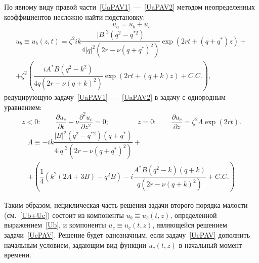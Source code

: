 По явному виду правой части~\eqref{UaPAV1}~---~\eqref{UaPAV2} методом неопределенных коэффициентов несложно найти подстановку:
\begin{equation}
u_{a}=u_{b}+u_{c}
\label{Ub+Uc}
\end{equation}
\begin{multline}
u_{b} \equiv u_{b} \left( z, t \right) = \zeta^{2}  i k \dfrac{\vert B \vert^{2} \left( q^{2}-q^{*2}\right)}{4 \vert q \vert^{2} \left( 2 r-\nu \left( q + q^{*} \right)^{2}\right)} \exp \left( 2 r t+ \left( q+q^{*}\right) z \right)+ \\
+\zeta^{2} \left( \dfrac{i A^{*} B \left( q^{2} - k^{2} \right)}{4 q \left( 2 r - \nu \left( q+k \right)^{2} \right)} \exp \left( 2 r t +\left( q+k\right) z \right) +C.C. \right),
\label{Ub}
\end{multline}
редуцирующую задачу~\eqref{UaPAV1}~---~\eqref{UaPAV2} в задачу с однородным уравнением:
\begin{equation}
z<0: \qquad  \dfrac{\partial u_{c}}{\partial t}- \nu \dfrac{\partial^{2} u_{c}}{\partial z^{2}}=0; \qquad \qquad z=0:\qquad  \dfrac{\partial u_{c}}{\partial z}=\zeta^{2} \Lambda \exp \left( 2 r t \right).
\label{UcPAV}
\end{equation}
\begin{multline*}
\Lambda \equiv - i k \dfrac{\vert B \vert^{2} \left( q^{2}- q^{*2} \right) \left( q+q^{*} \right)}{4 \vert q \vert^{2} \left( 2 r - \nu \left( q+q^{*}\right)^{2} \right) }+ \\
+\left(\dfrac{1}{4} \left( k^{2} \left( 2 A+ 3 B \right) - q^{2} B \right) - i \dfrac{A^{*} B \left( q^{2} - k \right) \left( q+k \right) }{q \left( 2 r - \nu \left( q+k \right)^{2} \right)}+C.C. \right)
\end{multline*}

Таким образом, нециклическая часть решения задачи второго порядка малости  (см.~\eqref{Ub+Uc}) состоит из компоненты $ u_{b}\equiv u_{b}\left( t, z \right) $, определенной выражением~\eqref{Ub}, и компоненты $ u_{c}\equiv u_{c}\left( t, z \right) $, являющейся решением задачи~\eqref{UcPAV}. Решение будет однозначным, если задачу~\eqref{UcPAV} дополнить начальным условием, задающим вид функции $ u_{c}\left( t, z \right) $ в начальный момент времени.

